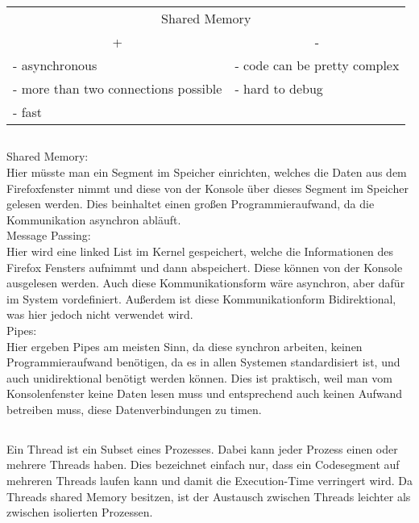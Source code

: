 \documentclass[a4paper, 11pt]{article}
\begin{document}
      \begin{table}[h]
            \begin{tabular}{@{}llll@{}}
                  \multicolumn{4}{c}{Shared Memory}                                                                                      \\
                  \multicolumn{2}{c}{+}                         & \multicolumn{2}{c}{-}                                          \\ \midrule
                  \multicolumn{2}{l|}{- asynchronous} & \multicolumn{2}{l}{- code can be pretty complex}            \\
                  \multicolumn{2}{l|}{- more than two connections possible} & \multicolumn{2}{l}{- hard to debug} \\
                  \multicolumn{2}{l|}{- fast}      & \multicolumn{2}{l}{}                                          
            \end{tabular}
      \end{table}
      \subsection{}
      Shared Memory: \\
      Hier müsste man ein Segment im Speicher einrichten, welches die Daten aus dem Firefoxfenster nimmt und diese von der Konsole über dieses Segment im Speicher gelesen werden.
      Dies beinhaltet einen großen Programmieraufwand, da die Kommunikation asynchron abläuft.\\
      Message Passing:\\
      Hier wird eine linked List im Kernel gespeichert, welche die Informationen des Firefox Fensters aufnimmt und dann abspeichert. Diese können von der Konsole ausgelesen werden.
      Auch diese Kommunikationsform wäre asynchron, aber dafür im System vordefiniert. Außerdem ist diese Kommunikationform Bidirektional, was hier jedoch nicht verwendet wird.
      \\
      Pipes:\\
      Hier ergeben Pipes am meisten Sinn, da diese synchron arbeiten, keinen Programmieraufwand benötigen, da es in allen Systemen standardisiert ist, und
      auch unidirektional benötigt werden können. Dies ist praktisch, weil man vom Konsolenfenster keine Daten lesen muss und entsprechend auch keinen Aufwand betreiben muss, diese Datenverbindungen zu timen.
      \newpage
      \subsection{}
      Ein Thread ist ein Subset eines Prozesses. Dabei kann jeder Prozess einen oder mehrere Threads haben. Dies bezeichnet einfach nur, dass ein Codesegment auf mehreren Threads laufen kann und damit die Execution-Time verringert wird.
      Da Threads shared Memory besitzen, ist der Austausch zwischen Threads leichter als zwischen isolierten Prozessen.
\end{document}
